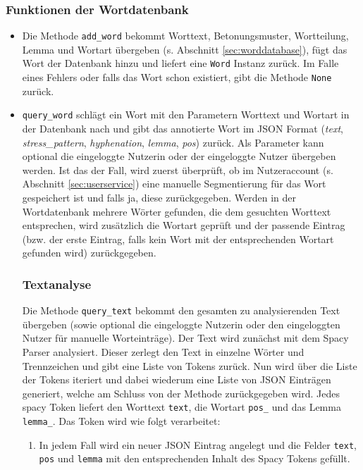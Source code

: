\subsubsection{Funktionen der Wortdatenbank}
\begin{itemize}
	\item Die Methode \texttt{add\_word} bekommt Worttext, Betonungsmuster, Wortteilung, Lemma und Wortart übergeben (s. Abschnitt \ref{sec:worddatabase}), fügt das Wort der Datenbank hinzu und liefert eine \texttt{Word} Instanz zurück. Im Falle eines Fehlers oder falls das Wort schon existiert, gibt die Methode \texttt{None} zurück.
	
	\item \texttt{query\_word} schlägt ein Wort mit den Parametern Worttext und Wortart in der Datenbank nach und gibt das annotierte Wort im JSON Format (\textit{text}, \textit{stress\_pattern}, \textit{hyphenation}, \textit{lemma}, \textit{pos}) zurück. Als Parameter kann optional die eingeloggte Nutzerin oder der eingeloggte Nutzer übergeben werden. Ist das der Fall, wird zuerst überprüft, ob im Nutzeraccount (s. Abschnitt \ref{sec:userservice}) eine manuelle Segmentierung für das Wort gespeichert ist und falls ja, diese zurückgegeben. Werden in der Wortdatenbank mehrere Wörter gefunden, die dem gesuchten Worttext entsprechen, wird zusätzlich die Wortart geprüft und der passende Eintrag (bzw. der erste Eintrag, falls kein Wort mit der entsprechenden Wortart gefunden wird) zurückgegeben.
	
\subsubsection{Textanalyse}
Die Methode \texttt{query\_text} bekommt den gesamten zu analysierenden Text übergeben (sowie optional die eingeloggte Nutzerin oder den eingeloggten Nutzer für manuelle Worteinträge). Der Text wird zunächst mit dem Spacy Parser analysiert. Dieser zerlegt den Text in einzelne Wörter und Trennzeichen und gibt eine Liste von Tokens zurück. Nun wird über die Liste der Tokens iteriert und dabei wiederum eine Liste von JSON Einträgen generiert, welche am Schluss von der Methode zurückgegeben wird. Jedes spacy Token liefert den Worttext \texttt{text}, die Wortart \texttt{pos\_} und das Lemma \texttt{lemma\_}. Das Token wird wie folgt verarbeitet:

\begin{enumerate}
	\item In jedem Fall wird ein neuer JSON Eintrag angelegt und die Felder \texttt{text}, \texttt{pos} und \texttt{lemma} mit den entsprechenden Inhalt des Spacy Tokens gefüllt.
	

\end{enumerate}
\end{itemize}

